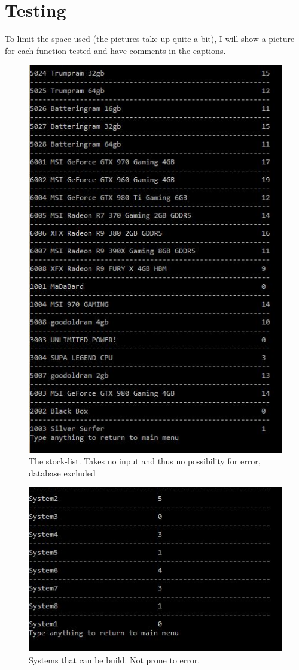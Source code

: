 \documentclass[a4paper,10pt]{article}
\begin{document}
\section{Testing}
To limit the space used (the pictures take up quite a bit), I will show a picture for each function tested and have comments in the captions. 
\begin{figure}[H]\center
	\includegraphics[scale=1]{Test1.jpg}
	\caption{The stock-list. Takes no input and thus no possibility for error, database excluded}
\end{figure}

\begin{figure}[H]\center
	\includegraphics[scale=1]{Test2Systems.jpg}
	\caption{Systems that can be build. Not prone to error.}
\end{figure}
\end{document}
